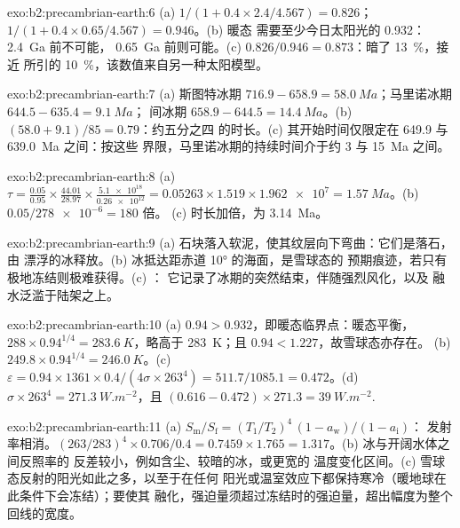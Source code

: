 \begin{solution}{exo:b2:precambrian-earth:6}
(a) $1/(1 + 0.4\times2.4/4.567) = 0.826$；$1/(1 + 0.4\times0.65/4.567) = 0.946$。(b) 暖态
需要至少今日太阳光的 0.932：\qty{2.4}{Ga} 前不可能，
\qty{0.65}{Ga} 前则可能。(c) $0.826/0.946 = 0.873$：暗了 \qty{13}{\percent}，接近
所引的 \qty{10}{\percent}，该数值来自另一种太阳模型。
\end{solution}

\begin{solution}{exo:b2:precambrian-earth:7}
(a) 斯图特冰期 $716.9 - 658.9 = \qty{58.0}{Ma}$；马里诺冰期 $644.5 - 635.4 = \qty{9.1}{Ma}$；
间冰期 $658.9 - 644.5 = \qty{14.4}{Ma}$。(b) $(58.0 + 9.1)/85 = 0.79$：约五分之四
的时长。(c) 其开始时间仅限定在 649.9 与 \qty{639.0}{Ma} 之间：按这些
界限，马里诺冰期的持续时间介于约 3 与 \qty{15}{Ma} 之间。
\end{solution}

\begin{solution}{exo:b2:precambrian-earth:8}
(a) $\tau = \frac{0.05}{0.95}\times\frac{44.01}{28.97}\times\frac{\num{5.1e18}}{\num{0.26e12}} =
0.05263\times1.519\times\num{1.962e7} = \qty{1.57}{Ma}$。(b) $0.05/\num{278e-6} = 180$ 倍。
(c) 时长加倍，为 \qty{3.14}{Ma}。
\end{solution}

\begin{solution}{exo:b2:precambrian-earth:9}
(a) 石块落入软泥，使其纹层向下弯曲：它们是落石，由
漂浮的冰释放。(b) 冰抵达距赤道 \ang{10} 的海面，是雪球态的
预期痕迹，若只有极地冻结则极难获得。(c) ：
它记录了冰期的突然结束，伴随强烈风化，以及
融水泛滥于陆架之上。
\end{solution}

\begin{solution}{exo:b2:precambrian-earth:10}
(a) $0.94 > 0.932$，即暖态临界点：暖态平衡，$288\times0.94^{1/4} =
\qty{283.6}{K}$，略高于 \qty{283}{K}；且 $0.94 < 1.227$，故雪球态亦存在。
(b) $249.8\times0.94^{1/4} = \qty{246.0}{K}$。(c) $\varepsilon = 0.94\times1361\times0.4/(4\sigma
\times263^4) = 511.7/1085.1 = 0.472$。(d) $\sigma\times263^4 = \qty{271.3}{W.m^{-2}}$，且 $(0.616
- 0.472)\times271.3 = \qty{39}{W.m^{-2}}$.
\end{solution}

\begin{solution}{exo:b2:precambrian-earth:11}
(a) $S_{\text{m}}/S_{\text{f}} = (T_1/T_2)^4\,(1 - a_{\text{w}})/(1 - a_{\text{i}})$：
发射率相消。$(263/283)^4\times0.706/0.4 = 0.7459\times1.765 = 1.317$。(b) 冰与开阔水体之间反照率的
反差较小，例如含尘、较暗的冰，或更宽的
温度变化区间。(c) 雪球态反射的阳光如此之多，以至于在任何
阳光或温室效应下都保持寒冷（暖地球在此条件下会冻结）；要使其
融化，强迫量须超过冻结时的强迫量，超出幅度为整个回线的宽度。
\end{solution}

